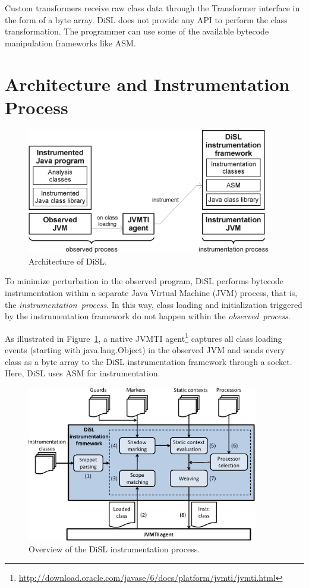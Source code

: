 \documentclass{article}
\newcommand{\brcode}[1]{\textsf{#1}}
\newcommand{\code}[1]{\mbox{\brcode{#1}}}
\begin{document}
Custom transformers receive raw class data through the \code{Transformer} interface in the form of a byte array.
DiSL does not provide any API to perform the class transformation.
The programmer can use some of the available bytecode manipulation frameworks like ASM.


\section{Architecture and Instrumentation Process}\label{sec:Framework}

\begin{figure}
\centering
\includegraphics[width=0.95\textwidth]{fig/architecture}
\caption{Architecture of DiSL.}\label{fig:arch}
\end{figure}


To minimize perturbation in the observed program, DiSL performs bytecode instrumentation within a separate Java Virtual Machine (JVM) process, that is, the \mbox{\emph{instrumentation process}}.
In this way, class loading and initialization triggered by the instrumentation framework do not happen within the \mbox{\emph{observed process}}.

As illustrated in Figure~\ref{fig:arch}, a native JVMTI agent\footnote{\url{http://download.oracle.com/javase/6/docs/platform/jvmti/jvmti.html}} captures all class loading events (starting with \code{java.lang.Object}) in the observed JVM and sends every class as a byte array to the DiSL instrumentation framework through a socket.
Here, DiSL uses ASM for instrumentation.

\begin{figure}
\centering
\includegraphics[width=0.90\textwidth]{fig/overview}
\caption{Overview of the DiSL instrumentation process.}\label{fig:overview}
\end{figure}
\end{document}

